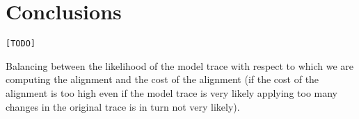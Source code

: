 \section{Conclusions}
\texttt{\color{red}[TODO]}
%
%
%

Balancing between the likelihood of the model trace with respect to which we are computing the alignment and the cost of the alignment (if the cost of the alignment is too high even if the model trace is very likely applying too many changes in the original trace is in turn not very likely). 